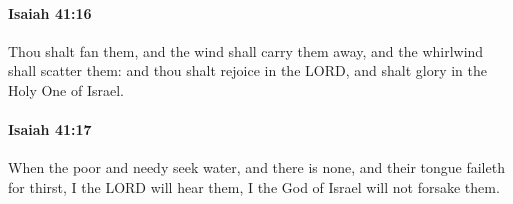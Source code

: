 		\paragraph{Isaiah 41:16} %
			\label{ISAIAH-41-16}

			Thou shalt fan them, and the wind shall carry them away, and the whirlwind shall scatter them: and thou shalt rejoice in the LORD, and shalt glory in the Holy One of Israel.


		\paragraph{Isaiah 41:17} %
			\label{ISAIAH-41-17}

			When the poor and needy seek water, and there is none, and their tongue faileth for thirst, I the LORD will hear them, I the God of Israel will not forsake them.


